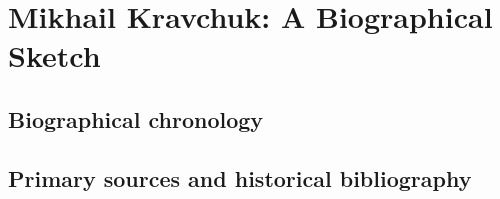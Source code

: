 \chapter{Mikhail Kravchuk: A Biographical Sketch}
\section{Biographical chronology}

\section{Primary sources and historical bibliography}

